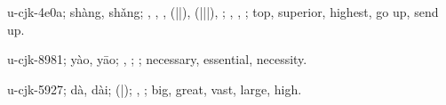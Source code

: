 \begin{multicols}{2}
{\cjkgGlue{}u-cjk-4e0a; shàng, shǎng; \cjkgGlue{}, \cjkgGlue{}, \cjkgGlue{}, \cjkgGlue{}\cjkgGlue{}(\cjkgGlue{}|\cjkgGlue{}|\cjkgGlue{}), \cjkgGlue{}\cjkgGlue{}(\cjkgGlue{}|\cjkgGlue{}|\cjkgGlue{}|\cjkgGlue{}), \cjkgGlue{}\cjkgGlue{}\cjkgGlue{}; \cjkgGlue{}, \cjkgGlue{}, \cjkgGlue{}; top, superior, highest, go up, send up.

\cjkgGlue{}u-cjk-8981; yào, yāo; \cjkgGlue{}\cjkgGlue{}\cjkgGlue{}, \cjkgGlue{}; \cjkgGlue{}; necessary, essential, necessity.

\cjkgGlue{}u-cjk-5927; dà, dài; \cjkgGlue{}\cjkgGlue{}(\cjkgGlue{}|\cjkgGlue{}); \cjkgGlue{}, \cjkgGlue{}; big, great, vast, large, high.

}
\end{multicols}
